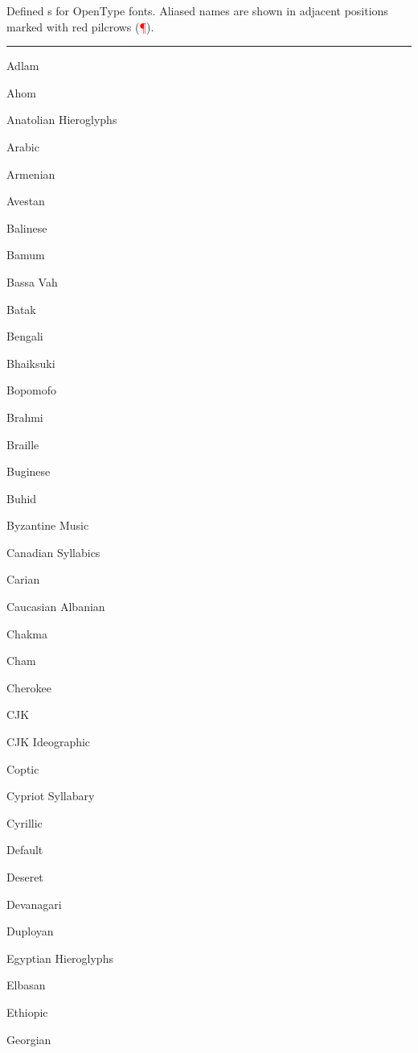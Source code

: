 \documentclass[a4paper]{l3doc}
\begin{document}
\begin{table}[!hbp]
  \caption{Defined s for OpenType fonts. Aliased names are shown in adjacent positions marked with red pilcrows ({\sffamily\textcolor{red}{\P}}).}
  \label{tab:ot-scpt}
\def\dup{\makebox[0pt][r]{\textcolor{red}{\P}}}
\setlength\columnseprule{0pt}
  \hrule
  \begin{multicols}{4}\setlength\parindent{0pt}
    \sffamily\scriptsize
    Adlam \par
    Ahom \par
    Anatolian Hieroglyphs \par
    Arabic \par
    Armenian \par
    Avestan \par
    Balinese \par
    Bamum \par
    Bassa Vah \par
    Batak \par
    Bengali \par
    Bhaiksuki \par
    Bopomofo \par
    Brahmi \par
    Braille \par
    Buginese \par
    Buhid \par
    Byzantine Music \par
    Canadian Syllabics \par
    Carian \par
    Caucasian Albanian \par
    Chakma \par
    Cham \par
    Cherokee \par
    \dup CJK \par
    \dup CJK Ideographic \par
    Coptic \par
    Cypriot Syllabary \par
    Cyrillic \par
    Default \par
    Deseret \par
    Devanagari \par
    Duployan \par
    Egyptian Hieroglyphs \par
    Elbasan \par
    Ethiopic \par
    Georgian \par

\end{multicols}
\end{table}
\end{document}
